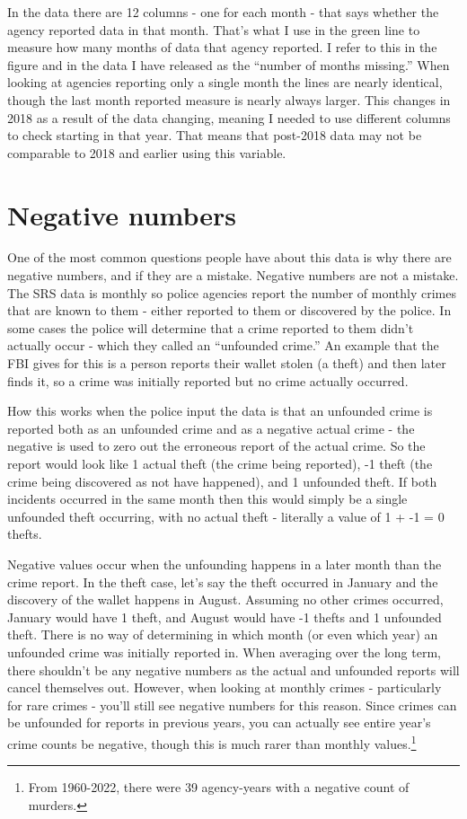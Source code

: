 \documentclass[
]{krantz}
\begin{document}
In the data there are 12 columns - one for each month - that
says whether the agency reported data in that month. That's
what I use in the green line to measure how many months of
data that agency reported. I refer to this in the figure and
in the data I have released as the ``number of months
missing.'' When looking at agencies reporting only a single
month the lines are nearly identical, though the last month
reported measure is nearly always larger. This changes in
2018 as a result of the data changing, meaning I needed to
use different columns to check starting in that year. That
means that post-2018 data may not be comparable to 2018 and
earlier using this variable.

\section{Negative numbers}\label{negative-numbers}

One of the most common questions people have about this data
is why there are negative numbers, and if they are a
mistake. Negative numbers are not a mistake. The SRS data is
monthly so police agencies report the number of monthly
crimes that are known to them - either reported to them or
discovered by the police. In some cases the police will
determine that a crime reported to them didn't actually
occur - which they called an ``unfounded crime.'' An example
that the FBI gives for this is a person reports their wallet
stolen (a theft) and then later finds it, so a crime was
initially reported but no crime actually occurred.

How this works when the police input the data is that an
unfounded crime is reported both as an unfounded crime and
as a negative actual crime - the negative is used to zero
out the erroneous report of the actual crime. So the report
would look like 1 actual theft (the crime being reported),
-1 theft (the crime being discovered as not have happened),
and 1 unfounded theft. If both incidents occurred in the
same month then this would simply be a single unfounded
theft occurring, with no actual theft - literally a value of
1 + -1 = 0 thefts.

Negative values occur when the unfounding happens in a later
month than the crime report. In the theft case, let's say
the theft occurred in January and the discovery of the
wallet happens in August. Assuming no other crimes occurred,
January would have 1 theft, and August would have -1 thefts
and 1 unfounded theft. There is no way of determining in
which month (or even which year) an unfounded crime was
initially reported in. When averaging over the long term,
there shouldn't be any negative numbers as the actual and
unfounded reports will cancel themselves out. However, when
looking at monthly crimes - particularly for rare crimes -
you'll still see negative numbers for this reason. Since
crimes can be unfounded for reports in previous years, you
can actually see entire year's crime counts be negative,
though this is much rarer than monthly values.\footnote{From
  1960-2022, there were 39 agency-years with a negative
  count of murders.}
\end{document}
